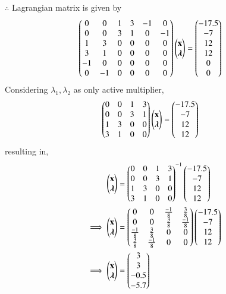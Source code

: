$\therefore$ Lagrangian matrix is given by
\begin{align}
\begin{pmatrix}0 & 0 & 1 & 3 & -1 & 0 \\ 0 & 0 & 3 & 1  & 0 & -1 \\ 1 & 3 & 0 & 0 & 0 & 0 \\ 3 & 1 & 0 & 0 & 0 & 0  \\ -1 & 0 & 0 & 0 & 0 & 0  \\ 0 & -1 & 0 & 0 & 0 & 0 \end{pmatrix}\begin{pmatrix}\mathbf{x} \\ \boldsymbol{\lambda} \end{pmatrix} &= \begin{pmatrix}-17.5 \\ -7 \\ 12 \\ 12 \\ 0 \\0 \end{pmatrix}
\end{align}
Considering $\lambda_1,\lambda_2$ as only active multiplier,
\begin{align}
\begin{pmatrix}0 & 0 & 1 & 3 \\ 0 & 0 & 3 & 1 \\ 1 & 3 & 0 & 0 \\ 3 & 1 & 0 & 0\end{pmatrix}\begin{pmatrix}\mathbf{x}\\ \boldsymbol{\lambda}\end{pmatrix} &= \begin{pmatrix}-17.5 \\ -7 \\ 12 \\ 12\end{pmatrix}
\end{align}
resulting in,
\begin{align}
\begin{pmatrix}\mathbf{x} \\ \boldsymbol{\lambda}\end{pmatrix} &= \begin{pmatrix}0 & 0 & 1 & 3 \\ 0 & 0 & 3 & 1 \\ 1 & 3 & 0 & 0 \\ 3 & 1 & 0 & 0\end{pmatrix}^{-1}\begin{pmatrix}-17.5 \\ -7 \\ 12 \\ 12\end{pmatrix}
\\
\implies   \begin{pmatrix}\mathbf{x} \\ \boldsymbol{\lambda}\end{pmatrix} &= \begin{pmatrix}0 & 0 & \frac{-1}{8} & \frac{3}{8} \\ 0 & 0 & \frac{3}{8} & \frac{-1}{8} \\ \frac{-1}{8} & \frac{3}{8} & 0 & 0 \\ \frac{3}{8} & \frac{-1}{8} & 0 & 0\end{pmatrix}\begin{pmatrix}-17.5 \\ -7 \\ 12 \\ 12\end{pmatrix}
\\
\implies \begin{pmatrix}\mathbf{x} \\ \boldsymbol{\lambda}\end{pmatrix} &= \begin{pmatrix}3 \\ 3 \\ -0.5 \\ -5.7 \end{pmatrix}
\end{align}
